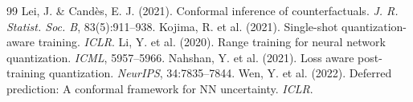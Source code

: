 \documentclass[12pt,a4paper]{article}
\theoremstyle{plain}
\begin{document}
\begin{thebibliography}{99}
     Lei, J. \& Cand\`es, E. J. (2021). Conformal inference of counterfactuals. \textit{J. R. Statist. Soc. B}, 83(5):911--938.
     Kojima, R. et al. (2021). Single-shot quantization-aware training. \textit{ICLR}.
     Li, Y. et al. (2020). Range training for neural network quantization. \textit{ICML}, 5957--5966.
     Nahshan, Y. et al. (2021). Loss aware post-training quantization. \textit{NeurIPS}, 34:7835--7844.
     Wen, Y. et al. (2022). Deferred prediction: A conformal framework for NN uncertainty. \textit{ICLR}.
\end{thebibliography}
\end{document}
